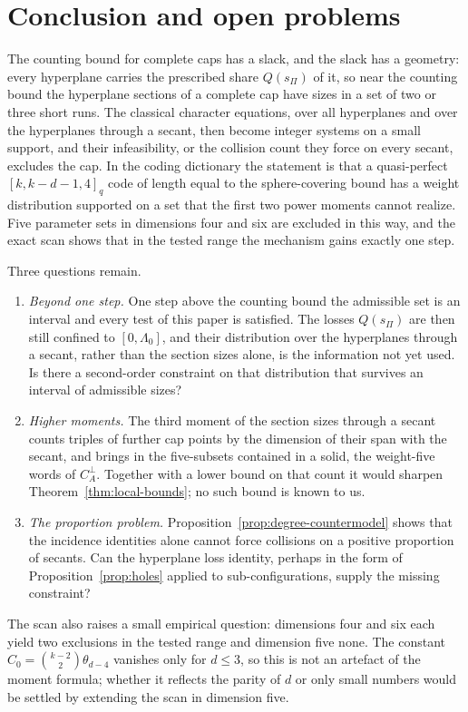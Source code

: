 \section{Conclusion and open problems}
\label{sec:conclusion}

The counting bound for complete caps has a slack, and the slack has a
geometry: every hyperplane carries the prescribed share
\(Q(s_\Pi)\) of it, so near the counting bound the hyperplane sections of
a complete cap have sizes in a set of two or three short runs.  The
classical character equations, over all hyperplanes and over the
hyperplanes through a secant, then become integer systems on a small
support, and their infeasibility, or the collision count they force on
every secant, excludes the cap.  In the coding dictionary the statement
is that a quasi-perfect \([k,k-d-1,4]_q\) code of length equal to the
sphere-covering bound has a weight distribution supported on a set that
the first two power moments cannot realize.  Five parameter sets in
dimensions four and six are excluded in this way, and the exact scan
shows that in the tested range the mechanism gains exactly one step.

Three questions remain.

\begin{enumerate}[label=(\arabic*),nosep]
\item \emph{Beyond one step.}  One step above the counting bound the
 admissible set is an interval and every test of this paper is
 satisfied.  The losses \(Q(s_\Pi)\) are then still confined to
 \([0,\Lambda_0]\), and their distribution over the hyperplanes through
 a secant, rather than the section sizes alone, is the information not
 yet used.  Is there a second-order constraint on that distribution that
 survives an interval of admissible sizes?
\item \emph{Higher moments.}  The third moment of the section sizes
 through a secant counts triples of further cap points by the dimension
 of their span with the secant, and brings in the five-subsets contained
 in a solid, the weight-five words of \(C_A^\perp\).  Together with a
 lower bound on that count it would sharpen Theorem~\ref{thm:local-bounds};
 no such bound is known to us.
\item \emph{The proportion problem.}  Proposition~\ref{prop:degree-countermodel}
 shows that the incidence identities alone cannot force collisions on a
 positive proportion of secants.  Can the hyperplane loss identity,
 perhaps in the form of Proposition~\ref{prop:holes} applied to
 sub-configurations, supply the missing constraint?
\end{enumerate}

The scan also raises a small empirical question: dimensions four and six
each yield two exclusions in the tested range and dimension five none.
The constant \(C_0=\binom{k-2}{2}\theta_{d-4}\) vanishes only for
\(d\le3\), so this is not an artefact of the moment formula; whether it
reflects the parity of \(d\) or only small numbers would be settled by
extending the scan in dimension five.
